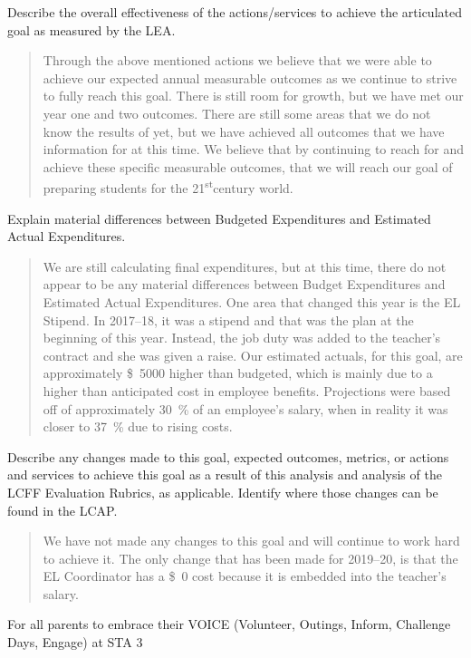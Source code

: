 \documentclass{article}
\newcommand{\st}{\textsuperscript{st}}
\newcommand{\dollar}[1]{\SI{#1}[\$]{}}
\newcounter{goal}[section] %
\newcounter{action}[goal]
\begin{document}
Describe the overall effectiveness of the actions/services to achieve the articulated goal as measured by the LEA.
\begin{quotation}
	Through the above mentioned actions we believe that we were able to achieve our expected annual measurable outcomes as we continue to strive to fully reach this goal. There is still room for growth, but we have met our year one and two outcomes. There are still some areas that we do not know the results of yet, but we have achieved all outcomes that we have information for at this time. We believe that by continuing to reach for and achieve these specific measurable outcomes, that we will reach our goal of preparing students for the 21\st century world.
\end{quotation}

Explain material differences between Budgeted Expenditures and Estimated Actual Expenditures.
\begin{quotation}
	We are still calculating final expenditures, but at this time, there do not appear to be any material differences between Budget Expenditures and Estimated Actual Expenditures. One area that changed this year is the EL Stipend. In 2017--18, it was a stipend and that was the plan at the beginning of this year. Instead, the job duty was added to the teacher's contract and she was given a raise. Our estimated actuals, for this goal, are approximately \dollar{5000} higher than budgeted, which is mainly due to a higher than anticipated cost in employee benefits. Projections were based off of approximately \SI{30}{\percent} of an employee's salary, when in reality it was closer to \SI{37}{\percent} due to rising costs.
\end{quotation}

Describe any changes made to this goal, expected outcomes, metrics, or actions and services to achieve this goal as a result of this analysis and analysis of the LCFF Evaluation Rubrics, as applicable. Identify where those changes can be found in the LCAP.
\begin{quotation}
	We have not made any changes to this goal and will continue to work hard to achieve it. The only change that has been made for 2019--20, is that the EL Coordinator has a \dollar{0} cost because it is embedded into the teacher's salary.
\end{quotation}

\Goal
	{For all parents to embrace their VOICE (Volunteer, Outings, Inform, Challenge Days, Engage) at STA}
	{3}
	{}
\end{document}
